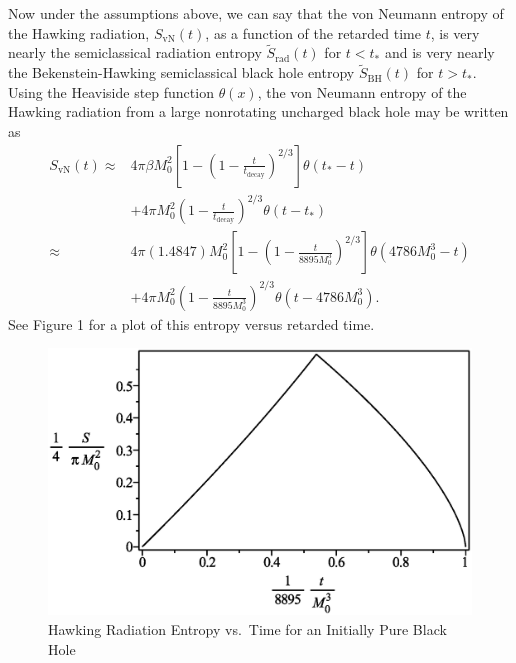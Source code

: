 \documentclass[12pt]{article}
\begin{document}
Now under the assumptions above, we can say that the von Neumann entropy of the Hawking radiation, $S_\mathrm{vN}(t)$, as a function of the retarded time $t$, is very nearly the semiclassical radiation entropy $\tilde{S}_\mathrm{rad}(t)$   for $t < t_\ast$ and is very nearly the Bekenstein-Hawking semiclassical black hole entropy $\tilde{S}_\mathrm{BH}(t)$ for $t > t_\ast$.  Using the Heaviside step function $\theta(x)$, the von Neumann entropy of the Hawking radiation from a large nonrotating uncharged black hole may be written as
\begin{equation}
\begin{split}
S_\mathrm{vN}(t) \approx {} &
4\pi\beta M_0^2\left[1-\left(1-\frac{t}{t_\mathrm{decay}}\right)^{2/3}\right]
\theta(t_\ast - t) \\ 
& +4\pi M_0^2\left(1-\frac{t}{t_\mathrm{decay}}\right)^{2/3}\theta(t - t_\ast)
\\
\approx {} &
4\pi(1.4847)M_0^2\left[1-\left(1-\frac{t}{8895 M_0^3}\right)^{2/3}\right]
\theta(4786M_0^3 - t)
\\
& +4\pi M_0^2\left(1-\frac{t}{8895 M_0^3}\right)^{2/3}
\theta(t - 4786 M_0^3). 
\label{rad-von-Neumann-entropy-evolution}
\end{split}
\end{equation}
See Figure 1 for a plot of this entropy versus retarded time.


\begin{figure}[H]
\centering
\includegraphics[scale=.75]
{Hawking-radiation-entropy-vs-time-graph-10f-is-0.eps}
\caption{Hawking Radiation Entropy vs.\ Time for an Initially Pure Black Hole}
\end{figure}
\end{document}
